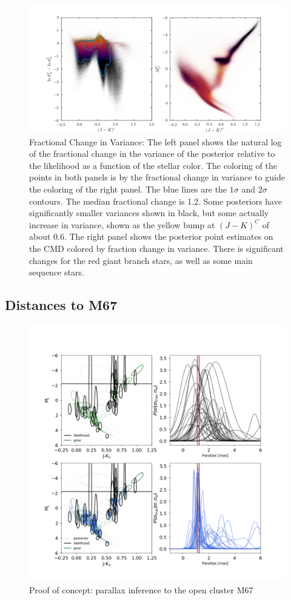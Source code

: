 \documentclass[modern]{aastex61}
\begin{document}
\begin{figure}
\centering
\includegraphics[width=\textwidth]{delta.png}
\caption{Fractional Change in Variance: The left panel shows the natural log of the fractional change in the variance of the posterior relative to the likelihood as a function of the stellar color. The coloring of the points in both panels is by the fractional change in variance to guide the coloring of the right panel. The blue lines are the $1\sigma$ and $2\sigma$ contours. The median fractional change is 1.2. Some posteriors have significantly smaller variances shown in black, but some actually increase in variance, shown as the yellow bump at $(J-K)^C$ of about 0.6. The right panel shows the posterior point estimates on the CMD colored by fraction change in variance. There is significant changes for the red giant branch stars, as well as some main sequence stars.}
\label{fig:delta}
\end{figure}


\subsection{Distances to M67}
\begin{figure}
\centering
  \includegraphics[width=\textwidth]{distancesM67.png}
\caption{Proof of concept: parallax inference to the open cluster M67}
\label{fig:m67}
\end{figure}
\end{document}
